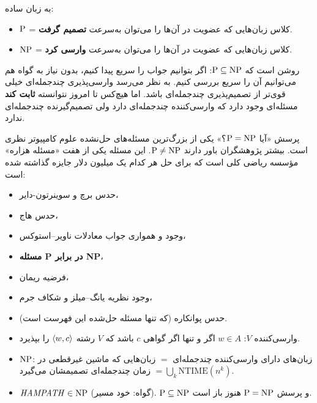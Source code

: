 به زبان ساده:
\begin{itemize}
\item $\mathrm{P}$ = کلاس زبان‌هایی که عضویت در آن‌ها را می‌توان به‌سرعت \textbf{تصمیم گرفت}.
\item $\mathrm{NP}$ = کلاس زبان‌هایی که عضویت در آن‌ها را می‌توان به‌سرعت \textbf{وارسی کرد}.
\end{itemize}

روشن است که $\mathrm{P}\subseteq\mathrm{NP}$: اگر بتوانیم جواب را سریع پیدا کنیم، بدون نیاز به گواه هم می‌توانیم آن را سریع بررسی کنیم. به نظر می‌رسد وارسی‌پذیری چندجمله‌ای خیلی قوی‌تر از تصمیم‌پذیری چندجمله‌ای باشد. اما هیچ‌کس تا امروز نتوانسته \textbf{ثابت کند} مسئله‌ای وجود دارد که وارسی‌کننده چندجمله‌ای دارد ولی تصمیم‌گیرنده چندجمله‌ای ندارد.

\begin{ltrfig}
\end{ltrfig}

پرسش «آیا $\mathrm{P}=\mathrm{NP}$؟» یکی از بزرگ‌ترین مسئله‌های حل‌نشده علوم کامپیوتر نظری است. بیشتر پژوهشگران باور دارند $\mathrm{P}\neq\mathrm{NP}$. این مسئله یکی از هفت «مسئله هزاره» مؤسسه ریاضی کلی است که برای حل هر کدام یک میلیون دلار جایزه گذاشته شده است:
\begin{itemize}
\item حدس برچ و سوینرتون-دایر،
\item حدس هاج،
\item وجود و همواری جواب معادلات ناویر–استوکس،
\item \textbf{مسئله P در برابر NP}،
\item فرضیه ریمان،
\item وجود نظریه یانگ–میلز و شکاف جرم،
\item حدس پوانکاره (که تنها مسئله حل‌شده این فهرست است).
\end{itemize}

\begin{summary}
\begin{itemize}
\item وارسی‌کننده $V$: $w\in A$ اگر و تنها اگر گواهی $c$ باشد که $V$ رشته $\langle w,c\rangle$ را بپذیرد.
\item $\mathrm{NP}$: زبان‌های دارای وارسی‌کننده چندجمله‌ای $=$ زبان‌هایی که ماشین غیرقطعی در زمان چندجمله‌ای تصمیمشان می‌گیرد $=\bigcup_k\mathrm{NTIME}(n^k)$.
\item $\mathit{HAMPATH}\in\mathrm{NP}$ (گواه: خود مسیر). $\mathrm{P}\subseteq\mathrm{NP}$ و پرسش $\mathrm{P}=\mathrm{NP}$ هنوز باز است.
\end{itemize}
\end{summary}
